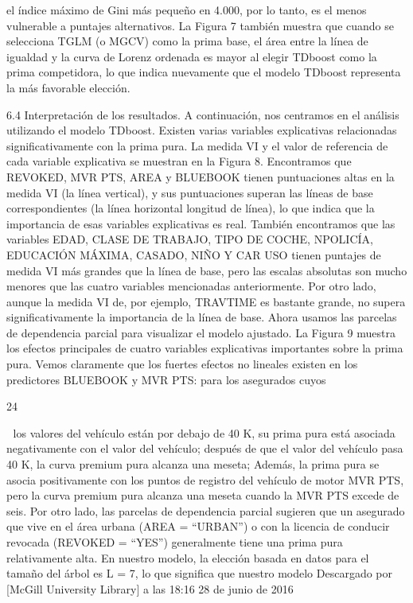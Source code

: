 \documentclass[]{article}
\begin{document}
el índice máximo de Gini más pequeño en 4.000, por lo tanto, es el menos
vulnerable a puntajes alternativos. La Figura 7 también muestra que
cuando se selecciona TGLM (o MGCV) como la prima base, el área entre la
línea de igualdad y la curva de Lorenz ordenada es mayor al elegir
TDboost como la prima competidora, lo que indica nuevamente que el
modelo TDboost representa la más favorable elección.

6.4 Interpretación de los resultados. A continuación, nos centramos en
el análisis utilizando el modelo TDboost. Existen varias variables
explicativas relacionadas significativamente con la prima pura. La
medida VI y el valor de referencia de cada variable explicativa se
muestran en la Figura 8. Encontramos que REVOKED, MVR PTS, AREA y
BLUEBOOK tienen puntuaciones altas en la medida VI (la línea vertical),
y sus puntuaciones superan las líneas de base correspondientes (la línea
horizontal longitud de línea), lo que indica que la importancia de esas
variables explicativas es real. También encontramos que las variables
EDAD, CLASE DE TRABAJO, TIPO DE COCHE, NPOLICÍA, EDUCACIÓN MÁXIMA,
CASADO, NIÑO Y CAR USO tienen puntajes de medida VI más grandes que la
línea de base, pero las escalas absolutas son mucho menores que las
cuatro variables mencionadas anteriormente. Por otro lado, aunque la
medida VI de, por ejemplo, TRAVTIME es bastante grande, no supera
significativamente la importancia de la línea de base. Ahora usamos las
parcelas de dependencia parcial para visualizar el modelo ajustado. La
Figura 9 muestra los efectos principales de cuatro variables
explicativas importantes sobre la prima pura. Vemos claramente que los
fuertes efectos no lineales existen en los predictores BLUEBOOK y MVR
PTS: para los asegurados cuyos

24

 los valores del vehículo están por debajo de 40 K, su prima pura está
asociada negativamente con el valor del vehículo; después de que el
valor del vehículo pasa 40 K, la curva premium pura alcanza una meseta;
Además, la prima pura se asocia positivamente con los puntos de registro
del vehículo de motor MVR PTS, pero la curva premium pura alcanza una
meseta cuando la MVR PTS excede de seis. Por otro lado, las parcelas de
dependencia parcial sugieren que un asegurado que vive en el área urbana
(AREA = ``URBAN'') o con la licencia de conducir revocada (REVOKED =
``YES'') generalmente tiene una prima pura relativamente alta. En
nuestro modelo, la elección basada en datos para el tamaño del árbol es
L = 7, lo que significa que nuestro modelo Descargado por {[}McGill
University Library{]} a las 18:16 28 de junio de 2016
\end{document}
